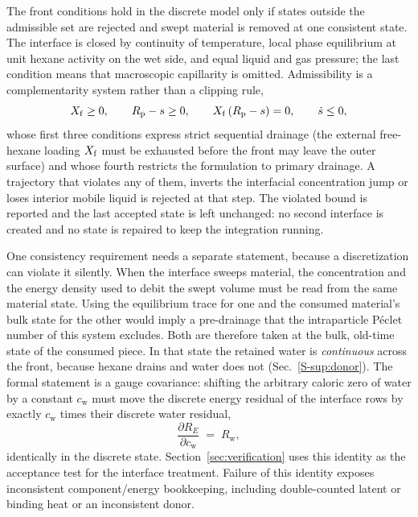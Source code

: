 The front conditions hold in the discrete model only if states outside the
admissible set are rejected and swept material is removed at one consistent
state. The interface is closed by continuity of temperature, local phase
equilibrium at unit hexane activity on the wet side, and equal liquid and gas
pressure; the last condition means that macroscopic capillarity is omitted. Admissibility is a complementarity
system rather than a clipping rule,
\begin{equation}
X_{\mathrm{f}} \ge 0, \qquad R_{\mathrm{p}} - s \ge 0, \qquad X_{\mathrm{f}}\,(R_{\mathrm{p}}-s) = 0,
\qquad \dot{s} \le 0 ,
\label{eq:complementarity}
\end{equation}
whose first three conditions express strict sequential drainage (the
external free-hexane loading $X_{\mathrm{f}}$ must be exhausted before the front may
leave the outer surface) and whose fourth restricts the formulation to
primary drainage. A trajectory that violates any of them, inverts the
interfacial concentration jump or loses interior mobile liquid is rejected
at that step. The violated bound is reported and the last accepted state
is left unchanged: no second interface is created and no state is repaired
to keep the integration running.

One consistency requirement needs a separate statement, because a
discretization can violate it silently. When the interface sweeps material,
the concentration and the energy density used to debit the swept volume must
be read from the same material state. Using the equilibrium trace for one and
the consumed material's bulk state for the other would imply a pre-drainage
that the intraparticle P\'eclet number of this system excludes. Both are
therefore taken at the bulk, old-time state of the consumed piece. In that
state the retained water is \emph{continuous} across the front, because hexane
drains and water does not (Sec.~\ref*{S-sup:donor}). The formal statement is a gauge covariance: shifting the
arbitrary caloric zero of water by a constant $c_{\mathrm{w}}$ must move the
discrete energy residual of the interface rows by exactly $c_{\mathrm{w}}$
times their discrete water residual,
\begin{equation}
\frac{\partial R_{E}}{\partial c_{\mathrm{w}}} \;=\; R_{\mathrm{w}} ,
\label{eq:gauge}
\end{equation}
identically in the discrete state. Section~\ref{sec:verification} uses
this identity as the acceptance test for the interface treatment. Failure of this identity exposes inconsistent component/energy bookkeeping,
including double-counted latent or binding heat or an inconsistent donor.


